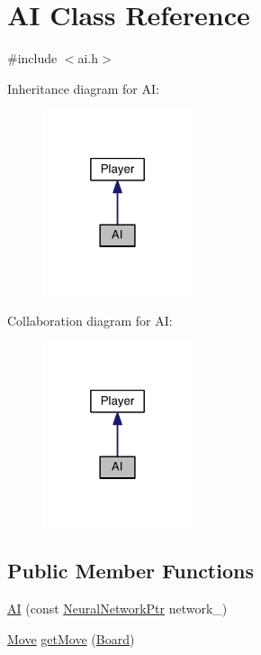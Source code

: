 \hypertarget{class_a_i}{}\section{AI Class Reference}
\label{class_a_i}


{\ttfamily \#include $<$ai.\+h$>$}



Inheritance diagram for AI\+:\nopagebreak
\begin{figure}[H]
\begin{center}
\leavevmode
\includegraphics[width=124pt]{class_a_i__inherit__graph}
\end{center}
\end{figure}


Collaboration diagram for AI\+:\nopagebreak
\begin{figure}[H]
\begin{center}
\leavevmode
\includegraphics[width=124pt]{class_a_i__coll__graph}
\end{center}
\end{figure}
\subsection*{Public Member Functions}
\begin{DoxyCompactItemize}
\item 
\hyperlink{class_a_i_a24760cc7163907dee1ff7ec9df8fa7af}{AI} (const \hyperlink{ai_8h_aafca5132d037883f5cd25160f7ccdc0d}{Neural\+Network\+Ptr} network\+\_\+)
\item 
\hyperlink{struct_move}{Move} \hyperlink{class_a_i_a2d1a6ed520e3b3ada7133bd03d405d6d}{get\+Move} (\hyperlink{constants_8h_af901d0acc1572fb0c779f84ddd2c6ce8}{Board})
\end{DoxyCompactItemize}


